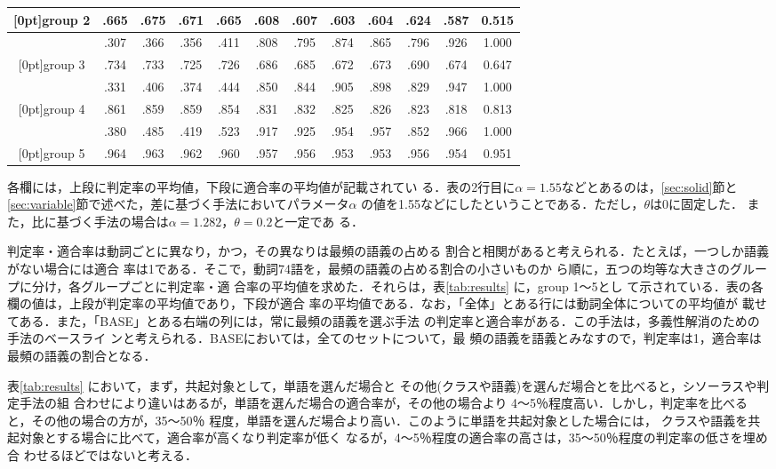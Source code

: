 \begin{table}[htbp]
\begin{center}
\begin{tabular}{|c|cc|cc|cc|cc|cc|c|}
   \raisebox{1.6ex}[0pt]{group 2} & .665 & .675 & .671 & .665 & .608 & .607 & .603 &  .604 & .624 & .587 & 0.515\\ \hline 
                            & .307 & .366 & .356 & .411 & .808 & .795 & .874 &  .865 & .796 & .926 & 1.000\\
   \raisebox{1.6ex}[0pt]{group 3} & .734 & .733 & .725 & .726 & .686 & .685 & .672 &  .673 & .690 & .674 & 0.647\\ \hline 
                            & .331 & .406 & .374 & .444 & .850 & .844 & .905 &  .898 & .829 & .947 & 1.000\\
   \raisebox{1.6ex}[0pt]{group 4} & .861 & .859 & .859 & .854 & .831 & .832 & .825 &  .826 & .823 & .818 & 0.813\\ \hline 
                            & .380 & .485 & .419 & .523 & .917 & .925 & .954 &  .957 & .852 & .966 & 1.000\\
   \raisebox{1.6ex}[0pt]{group 5} & .964 & .963 & .962 & .960 & .957 & .956 & .953 &  .953 & .956 & .954 & 0.951\\ \hline 
       \end{tabular}
   \end{center}
   各欄には，上段に判定率の平均値，下段に適合率の平均値が記載されてい
る．表の2行目に$\alpha = 1.55$などとあるのは，\ref{sec:solid}節と
\ref{sec:variable}節で述べた，差に基づく手法においてパラメータ$\alpha$
の値を1.55などにしたということである．ただし，$\theta$は0に固定した．
また，比に基づく手法の場合は$\alpha = 1.282$，$\theta = 0.2$と一定であ
る．
\end{table}

判定率・適合率は動詞ごとに異なり，かつ，その異なりは最頻の語義の占める
割合と相関があると考えられる．たとえば，一つしか語義がない場合には適合
率は1である．そこで，動詞74語を，最頻の語義の占める割合の小さいものか
ら順に，五つの均等な大きさのグループに分け，各グループごとに判定率・適
合率の平均値を求めた．それらは，表\ref{tab:results} に，group 1〜5とし
て示されている．表の各欄の値は，上段が判定率の平均値であり，下段が適合
率の平均値である．なお，「全体」とある行には動詞全体についての平均値が
載せてある．また，「BASE」とある右端の列には，常に最頻の語義を選ぶ手法
の判定率と適合率がある．この手法は，多義性解消のための手法のベースライ
ンと考えられる\cite{Gale92}．BASEにおいては，全てのセットについて，最
頻の語義を語義とみなすので，判定率は1，適合率は最頻の語義の割合となる．

表\ref{tab:results} において，まず，共起対象として，単語を選んだ場合と
その他(クラスや語義)を選んだ場合とを比べると，シソーラスや判定手法の組
合わせにより違いはあるが，単語を選んだ場合の適合率が，その他の場合より
4〜5％程度高い．しかし，判定率を比べると，その他の場合の方が，35〜50％
程度，単語を選んだ場合より高い．このように単語を共起対象とした場合には，
クラスや語義を共起対象とする場合に比べて，適合率が高くなり判定率が低く
なるが，4〜5％程度の適合率の高さは，35〜50％程度の判定率の低さを埋め合
わせるほどではないと考える．

